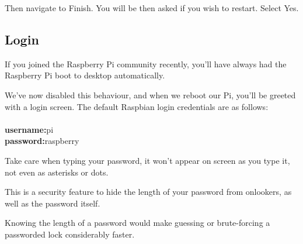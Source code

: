 		Then navigate to Finish. You will be then asked if you wish to restart. Select Yes.
		
	\subsection{Login}
	
		If you joined the Raspberry Pi community recently, you'll have always had the Raspberry Pi boot to desktop automatically.
		
		We've now disabled this behaviour, and when we reboot our Pi, you'll be greeted with a login screen. The default Raspbian login credentials are as follows:
		\\
		\\\textbf{username:}\hspace{2cm}pi
		\\\textbf{password:}\hspace{2cm}raspberry
		
		Take care when typing your password, it won't appear on screen as you type it, not even as asterisks or dots.
		
		\begin{aside}
		This is a security feature to hide the length of your password from onlookers, as well as the password itself.
		
		Knowing the length of a password would make guessing or brute-forcing a passworded lock considerably faster.
		\end{aside}